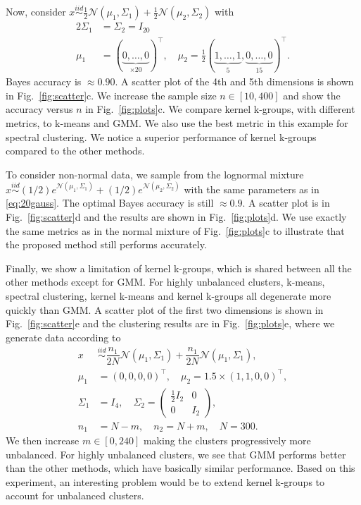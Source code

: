 \documentclass[10pt,journal,compsoc]{IEEEtran}
\begin{document}
Now, consider
$x \stackrel{iid}{\sim} \tfrac{1}{2} \mathcal{N}(\mu_1,\Sigma_1)+
\tfrac{1}{2} \mathcal{N}(\mu_2,\Sigma_2)$
with 
\begin{equation}
\label{eq:20gauss}
\begin{split}
2\Sigma_1 &= \Sigma_2 = I_{20} \\
\mu_1 &= (\underbrace{0,\dotsc,0}_{\times 20})^\top , 
\quad \mu_2 = \tfrac{1}{2} 
(\underbrace{1,\dotsc,1}_{5},\underbrace{0,\dotsc,0}_{15})^\top.
\end{split}
\end{equation}
Bayes accuracy is $\approx 0.90$.  A scatter plot of the 4th and 5th
dimensions is shown in Fig.~\ref{fig:scatter}c.
We increase the sample size $n \in [10, 400]$ and show
the accuracy versus $n$ in Fig.~\ref{fig:plots}c. We compare
kernel k-groups, with different metrics,
to k-means and GMM. We also use
the best metric in this example for spectral clustering.
We notice a superior performance of kernel k-groups 
compared to the other methods.

To consider non-normal data, we sample from the lognormal mixture 
$x \stackrel{iid}{\sim}  
(1/2) e^{\mathcal{N}(\mu_1,\Sigma_1)}+
(1/2) e^{\mathcal{N}(\mu_2,\Sigma_2)}$ with the same
parameters as in \eqref{eq:20gauss}. 
The optimal Bayes accuracy is still $\approx 0.9$.
A scatter plot is in Fig.~\ref{fig:scatter}d and the
results are shown in Fig.~\ref{fig:plots}d.
We use exactly the same metrics as in the normal
mixture of Fig.~\ref{fig:plots}c to illustrate that the 
proposed method still performs accurately.

Finally, we show a limitation of kernel k-groups, which is shared
between 
all the other methods except for GMM.
For highly unbalanced clusters, k-means, spectral
clustering, kernel k-means and kernel k-groups all degenerate
more quickly than GMM. A scatter plot of the first two dimensions
is shown in Fig.~\ref{fig:scatter}e and the clustering results are
in Fig.~\ref{fig:plots}e,
where we generate data according to
\begin{equation}
\label{eq:gauss3}
\begin{split}
x &\stackrel{iid} \sim  
\dfrac{n_1}{2N} \mathcal{N}(\mu_1,\Sigma_1)+
\dfrac{n_1}{2N} \mathcal{N}(\mu_1,\Sigma_1), \\
\mu_1 &= (0,0,0,0)^\top , \quad
\mu_2 = 1.5\times (1,1,0,0)^\top, \\
\Sigma_1 &= I_4, \quad
\Sigma_2 = \left( 
\begin{array}{c|c} 
\tfrac{1}{2} I_2 & 0  \\ \hline
0 & I_2 
\end{array}\right), \\
n_1 &= N - m, \quad  n_2 = N + m, \quad N=300.
\end{split}
\end{equation}
We then increase $m \in [0,240]$ making
the clusters progressively more unbalanced.
For highly unbalanced clusters, we see that GMM performs better than
the other methods, which have basically similar performance.
Based on this experiment, an interesting problem would be to
extend kernel k-groups to account for unbalanced clusters.
\end{document}
